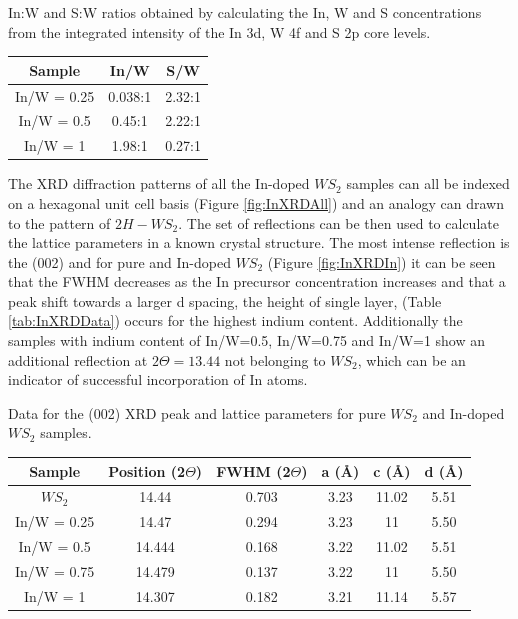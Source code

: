 \begin{table}[!ht]
\caption{In:W and S:W ratios obtained by calculating the In, W and S concentrations from the integrated intensity of the In 3d, W 4f and S 2p core levels.}
\label{tab:InRatios}
\end{table}

\begin{center}
\begin{tabular}{c|cc}

Sample 		& In/W 		& S/W\\\hline
In/W = 0.25 & 0.038:1 	& 2.32:1\\
In/W = 0.5	& 0.45:1	& 2.22:1\\
In/W = 1	& 1.98:1	& 0.27:1

\end{tabular}
\end{center}

The XRD diffraction patterns of all the In-doped $WS_2$ samples can all be indexed on a hexagonal unit cell basis (Figure \ref{fig:InXRDAll}) and an analogy can drawn to the pattern of $2H-WS_2$. The set of reflections can be then used to calculate the lattice parameters in a known crystal structure. The most intense reflection is the (002) and for pure and In-doped $WS_2$ (Figure \ref{fig:InXRDIn}) it can be seen that the FWHM decreases as the In precursor concentration increases and that a peak shift towards a larger d spacing, the height of single layer, (Table \ref{tab:InXRDData}) occurs for the highest indium content. Additionally the samples with indium content of In/W=0.5, In/W=0.75 and In/W=1 show an additional reflection at $2{\Theta}=13.44$ not belonging to $WS_2$, which can be an indicator of successful incorporation of In atoms.

\begin{table}[!ht]
\caption{Data for the (002) XRD peak and lattice parameters for pure $WS_2$ and In-doped $WS_2$ samples.}
\label{tab:InXRDData}
\end{table}

\begin{center}
\begin{tabular}{c|ccccc}

Sample 		& Position (2$\Theta$)	& FWHM (2$\Theta$)	& a (\r{A})	& c (\r{A})	& d (\r{A})	\\\hline
$WS_2$	 	& 14.44 				& 0.703				& 3.23		& 11.02		& 5.51		\\
In/W = 0.25	& 14.47					& 0.294				& 3.23		& 11		& 5.50		\\
In/W = 0.5	& 14.444				& 0.168				& 3.22		& 11.02		& 5.51		\\
In/W = 0.75	& 14.479				& 0.137				& 3.22		& 11		& 5.50		\\
In/W = 1	& 14.307				& 0.182				& 3.21		& 11.14		& 5.57

\end{tabular}
\end{center}

